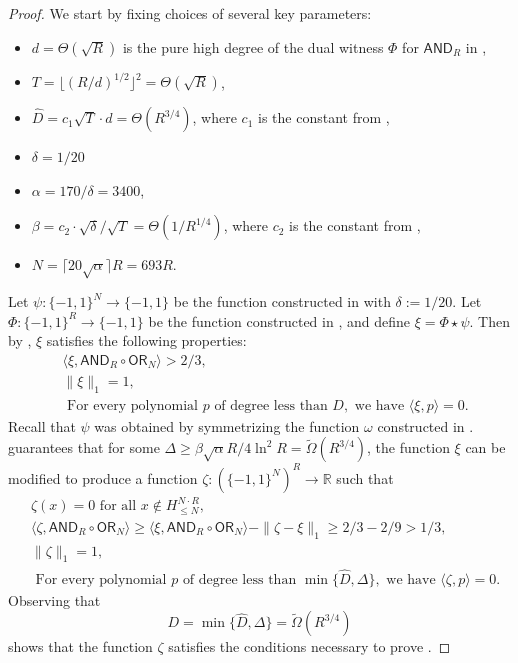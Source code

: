 \documentclass[11pt, letterpaper, fleqn]{article}
\theoremstyle{plain}
\newcommand{\R}{\mathbb{R}}
\newcommand{\OR}{\mathsf{ OR}}
\newcommand{\bits}{\{-1,1\}}
\newcommand{\ls}{\star}
\newcommand{\tOmega}{\tilde{\Omega}}
\newcommand{\AND}{\mathsf{AND}}
\begin{document}
\begin{proof}

We start by fixing choices of several key parameters:
\begin{itemize}
\item $d= \Theta(\sqrt{R})$ is the pure high degree of the dual witness $\Phi$ for $\AND_R$ in ,
\item $T = \lfloor(R/d)^{1/2}\rfloor^2 = \Theta(\sqrt{R})$,
\item $\hat{D} = c_1 \sqrt{T} \cdot d =\Theta(R^{3/4})$, where $c_1$ is the constant from ,
\item $\delta =1/20$
\item $\alpha = 170/\delta = 3400$,
\item $\beta = c_2 \cdot \sqrt{\delta} / \sqrt{T} = \Theta(1/R^{1/4})$, where $c_2$ is the constant from ,
\item $N = \lceil 20 \sqrt{\alpha} \rceil R = 693 R$.
\end{itemize}

Let $\psi : \bits^N \to \bits$ be the function constructed in  with $\delta:=1/20$. Let $\Phi : \bits^R \to \bits$ be the function constructed in , and define $\xi = \Phi \ls \psi$. Then by , $\xi$ satisfies the following properties:
\begin{align}& \langle \xi, \AND_R \circ \OR_N \rangle > 2/3, \\
& \| \xi \|_1 = 1, \\ 
& \text{ For every polynomial } p \text{ of degree less than } D, \text{ we have }\langle \xi, p \rangle = 0. 
\end{align}
Recall that $\psi$ was obtained by symmetrizing the function $\omega$ constructed in .
 guarantees that for some $\Delta \ge \beta \sqrt{\alpha} R / 4\ln^2 R = \tOmega(R^{3/4})$, the function $\xi$ can be modified to produce a function $\zeta : (\bits^N)^R \to \R$ such that
\begin{align*}
&\zeta(x) = 0 \text{ for all } x \not\in H_{\le N}^{N \cdot R}, \\
&\langle \zeta, \AND_R \circ \OR_N \rangle \ge \langle \xi, \AND_R \circ \OR_N \rangle - \|\zeta - \xi\|_1 \ge 2/3 - 2/9 > 1/3, \\
&\|\zeta\|_1 = 1, \\
& \text{ For every polynomial } p \text{ of degree less than } \min\{\hat{D}, \Delta\}, \text{ we have }\langle \zeta, p \rangle = 0. 
\end{align*}
Observing that
\[D =  \min\{\hat{D}, \Delta\} = \tOmega(R^{3/4})\]
shows that the function $\zeta$ satisfies the conditions necessary to prove .
\end{proof}
\end{document}
